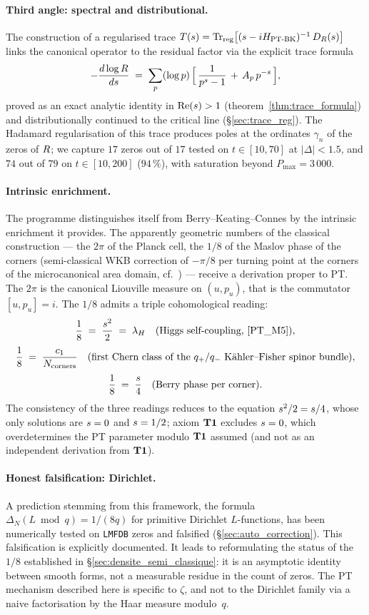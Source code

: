 \paragraph{Third angle: spectral and distributional.}
The construction of a regularised trace
$T(s) = \operatorname{Tr}_{\mathrm{reg}}\!\big[(s - iH_{\mathrm{PT\text{-}BK}})^{-1}\,D_R(s)\big]$
links the canonical operator to the residual factor via the explicit trace
formula
\[
-\dfrac{d \log R}{ds} \;=\; \sum_{p} (\log p)\,\Big[\,\dfrac{1}{p^s - 1} \,+\, A_p\,p^{-s}\,\Big],
\]
proved as an exact analytic identity in $\operatorname{Re}(s) > 1$
(theorem~\ref{thm:trace_formula}) and distributionally continued to the
critical line (\S\ref{sec:trace_reg}). The Hadamard regularisation of this
trace produces poles at the ordinates $\gamma_n$ of the zeros of
$R$; we capture $17$ zeros out of $17$ tested on $t \in [10, 70]$ at
$|\Delta| < 1.5$, and $74$ out of $79$ on $t \in [10, 200]$ ($94\,\%$),
with saturation beyond $P_{\max} = 3\,000$.

\paragraph{Intrinsic enrichment.}
The programme distinguishes itself from Berry--Keating--Connes by the
intrinsic enrichment it provides. The apparently geometric numbers of the
classical construction --- the $2\pi$ of the Planck cell, the $1/8$ of
the Maslov phase of the corners (semi-classical WKB correction of $-\pi/8$
per turning point at the corners of the microcanonical area domain,
cf.~\cite[\S 3]{BerryKeating1999}) --- receive a derivation proper to
PT. The $2\pi$ is the canonical Liouville measure on $(u, p_u)$,
that is the commutator $[u, p_u] = i$. The $1/8$ admits a triple
cohomological reading:
\[
\dfrac{1}{8}
\;=\; \dfrac{s^{2}}{2} \;=\; \lambda_H
\quad\text{(Higgs self-coupling, \cite{PT_M5})},
\]
\[
\dfrac{1}{8}
\;=\; \dfrac{c_1}{N_{\mathrm{corners}}}
\quad\text{(first Chern class of the $q_{+}/q_{-}$ K\"ahler--Fisher spinor bundle)},
\]
\[
\dfrac{1}{8} \;=\; \dfrac{s}{4}
\quad\text{(Berry phase per corner)}.
\]
The consistency of the three readings reduces to the equation
$s^{2}/2 = s/4$, whose only solutions are $s = 0$ and
$s = 1/2$; axiom $\textbf{T1}$ excludes $s = 0$, which overdetermines
the PT parameter modulo $\textbf{T1}$ assumed (and not as an independent
derivation from $\textbf{T1}$).

\paragraph{Honest falsification: Dirichlet.}
A prediction stemming from this framework, the formula
$\Delta_N(L \bmod q) = 1/(8q)$ for primitive Dirichlet $L$-functions, has
been numerically tested on \texttt{LMFDB} zeros and falsified
(\S\ref{sec:auto_correction}). This falsification is explicitly
documented. It leads to reformulating the status of the $1/8$ established
in \S\ref{sec:densite_semi_classique}: it is an asymptotic identity
between smooth forms, not a measurable residue in the count of zeros. The
PT mechanism described here is specific to $\zeta$, and not to the
Dirichlet family via a naive factorisation by the Haar measure
modulo~$q$.


